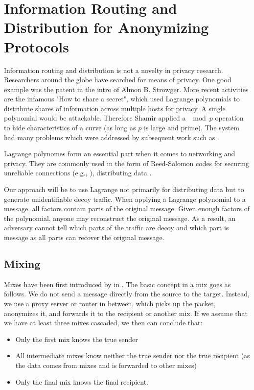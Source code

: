\chapter{Information Routing and Distribution for Anonymizing Protocols}
Information routing and distribution is not a novelty in privacy research. Researchers around the globe have searched for means of privacy.  One good example was the patent in the intro of Almon B. Strowger\cite{pulseDialingPatent}. More recent activities are the infamous "How to share a secret"\cite{shamir1979share}, which used Lagrange polynomials to distribute shares of information across multiple hosts for privacy. A single polynomial would be attackable. Therefore Shamir applied a $\mod p$ operation to hide characteristics of a curve (as long as $p$ is large and prime). The system had many problems which were addressed by subsequent work such as \cite{tompa1989share}.

Lagrange polynomes form an essential part when it comes to networking and privacy. They are commonly used in the form of Reed-Solomon codes for securing unreliable connections (e.g., \cite{aiache2008reed}), distributing data \cite{shamir1979share}.

Our approach will be to use Lagrange not primarily for distributing data but to generate unidentifiable decoy traffic. When applying a Lagrange polynomial to a message, all factors contain parts of the original message. Given enough factors of the polynomial, anyone may reconstruct the original message. As a result, an adversary cannot tell which parts of the traffic are decoy and which part is message as all parts can recover the original message.

\section{Mixing\label{sec:mixNets}}
Mixes have been first introduced by \cite{CHAUM1} in \citeyear{CHAUM1}. The basic concept in a mix goes as follows. We do not send a message directly from the source to the target. Instead, we use a proxy server or router in between, which picks up the packet, anonymizes it, and forwards it to the recipient or another mix. If we assume that we have at least three mixes cascaded, we then can conclude that:
\begin{itemize}
	\item Only the first mix knows the true sender
	\item All intermediate mixes know neither the true sender nor the true recipient (as the data comes from mixes and is forwarded to other mixes) 
	\item Only the final mix knows the final recipient.
\end{itemize}

